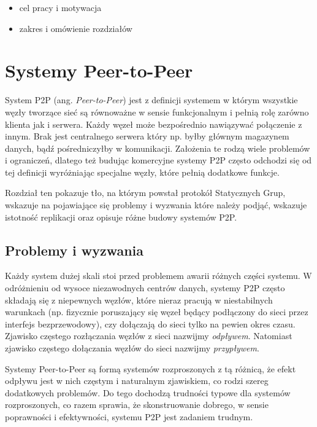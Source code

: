 \documentclass[12pt, twoside, openany]{report}
\begin{document}
\begin{itemize}
\item cel pracy i motywacja
\item zakres i omówienie rozdziałów
\end{itemize}


\chapter{Systemy Peer-to-Peer}

System P2P (ang. \textit{Peer-to-Peer}) jest z definicji systemem w którym wszystkie węzły tworzące sieć są równoważne w sensie funkcjonalnym i pełnią rolę zarówno klienta jak i serwera. Każdy węzeł może bezpośrednio nawiązywać połączenie z innym. Brak jest centralnego serwera który np. byłby głównym magazynem danych, bądź pośredniczyłby w komunikacji. Założenia te rodzą wiele problemów i ograniczeń, dlatego też budując komercyjne systemy P2P często odchodzi się od tej definicji wyróżniając specjalne węzły, które pełnią dodatkowe funkcje.

Rozdział ten pokazuje tło, na którym powstał protokół Statycznych Grup, wskazuje na pojawiające się problemy i wyzwania które należy podjąć, wskazuje istotność replikacji oraz opisuje różne budowy systemów P2P.

\section{Problemy i wyzwania}

Każdy system dużej skali stoi przed problemem awarii różnych części systemu. W odróżnieniu od wysoce niezawodnych centrów danych, systemy P2P często składają się z niepewnych węzłów, które nieraz pracują w niestabilnych warunkach (np. fizycznie poruszający się węzeł będący podłączony do sieci przez interfejs bezprzewodowy), czy dołączają do sieci tylko na pewien okres czasu. Zjawisko częstego rozłączania węzłów z sieci nazwijmy \textit{odpływem}. Natomiast zjawisko częstego dołączania węzłów do sieci nazwijmy \textit{przypływem}.

Systemy Peer-to-Peer są formą systemów rozproszonych z tą różnicą, że efekt odpływu jest w nich częstym i naturalnym zjawiskiem, co rodzi szereg dodatkowych problemów. Do tego dochodzą trudności typowe dla systemów rozproszonych, co razem sprawia, że skonstruowanie dobrego, w sensie poprawności i efektywności, systemu P2P jest zadaniem trudnym.
\end{document}
